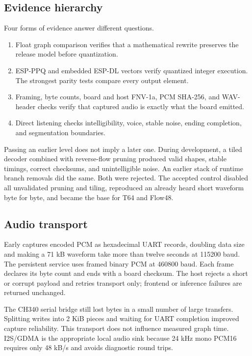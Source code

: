 \documentclass[10pt]{article}
\begin{document}
\subsection{Evidence hierarchy}

Four forms of evidence answer different questions.

\begin{enumerate}
  \item Float graph comparison verifies that a mathematical rewrite preserves
  the release model before quantization.
  \item ESP-PPQ and embedded ESP-DL vectors verify quantized integer execution.
  The strongest parity tests compare every output element.
  \item Framing, byte counts, board and host FNV-1a, PCM SHA-256, and WAV-header
  checks verify that captured audio is exactly what the board emitted.
  \item Direct listening checks intelligibility, voice, stable noise, ending
  completion, and segmentation boundaries.
\end{enumerate}

Passing an earlier level does not imply a later one. During development, a
tiled decoder combined with reverse-flow pruning produced valid shapes,
stable timings, correct checksums, and unintelligible noise. An earlier stack
of runtime branch removals did the same. Both were rejected. The accepted
control disabled all unvalidated pruning and tiling, reproduced an already
heard short waveform byte for byte, and became the base for T64 and Flow48.

\subsection{Audio transport}

Early captures encoded PCM as hexadecimal UART records, doubling data size and
making a 71 kB waveform take more than twelve seconds at 115200 baud. The
persistent service uses framed binary PCM at 460800 baud. Each frame declares
its byte count and ends with a board checksum. The host rejects a short or
corrupt payload and retries transport only; frontend or inference failures are
returned unchanged.

The CH340 serial bridge still lost bytes in a small number of large transfers.
Splitting writes into 2 KiB pieces and waiting for UART completion improved
capture reliability. This transport does not influence measured graph time.
I2S/GDMA is the appropriate local audio sink because 24 kHz mono PCM16 requires
only 48 kB/s and avoids diagnostic round trips.
\end{document}
